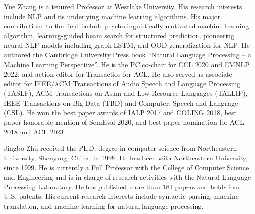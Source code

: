 \begin{IEEEbiography}
{Yue Zhang}
is a tenured Professor at Westlake University. His research interests include NLP and its underlying machine learning algorithms. His major contributions to the field include psycholinguistically motivated machine learning algorithm, learning-guided beam search for structured prediction, pioneering neural NLP models including graph LSTM, and OOD generalization for NLP. He authored the Cambridge University Press book ``Natural Language Processing -- a Machine Learning Perspective''. He is the PC co-chair for CCL 2020 and EMNLP 2022, and action editor for Transactios for ACL. He also served as associate editor for IEEE/ACM Transactions of Audio Speech and Language Processing (TASLP), ACM Transactions on Asian and Low-Resource Languages (TALLIP), IEEE Transactions on Big Data (TBD) and Computer, Speech and Language (CSL). He won the best paper awards of IALP 2017 and COLING 2018, best paper honorable mention of SemEval 2020, and best paper nomination for ACL 2018 and ACL 2023.
\end{IEEEbiography}
\vspace{-10mm}
\begin{IEEEbiography}
{Jingbo Zhu}
received the Ph.D. degree in computer science from Northeastern University, Shenyang, China, in 1999. He has been with Northeastern University, since 1999. He is currently a Full Professor with the College of Computer Science and Engineering and is in charge of research activities with the Natural Language Processing Laboratory. He has published more than 180 papers and holds four U.S. patents. His current research interests include syntactic parsing, machine translation, and machine learning for natural language processing.
\end{IEEEbiography}

